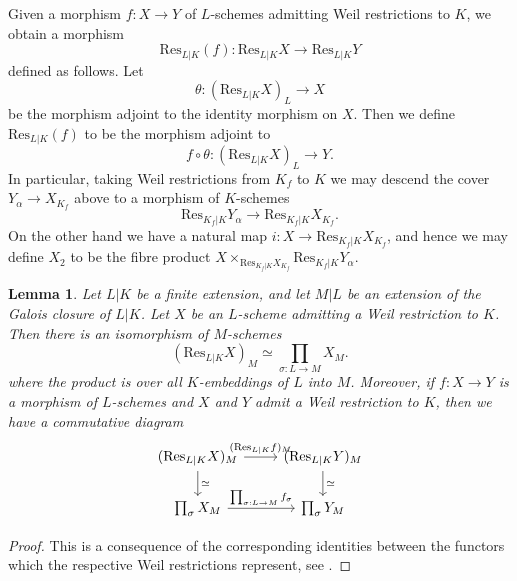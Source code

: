 \documentclass[11pt]{amsart}
\theoremstyle{plain}
\newtheorem{lemma}{Lemma}
\theoremstyle{definition}
\newcommand{\Res}{\mathrm{Res}}
\begin{document}
Given a morphism $f:X\to Y$ of $L$-schemes admitting Weil restrictions to $K$, we obtain a morphism
\[
\Res _{L|K}(f):\Res _{L|K}X\to \Res _{L|K}Y
\]
defined as follows. Let 
\[
\theta :(\Res _{L|K}X )_L \to X
\]
be the morphism adjoint to the identity morphism on $X$. Then we define $\Res _{L|K}(f)$ to be the morphism adjoint to 
\[
f\circ \theta : (\Res _{L|K}X)_L \to Y.
\]
In particular, taking Weil restrictions from $K_f$ to $K$ we may descend the cover $Y_{\alpha }\to X_{K_f }$ above to a morphism of $K$-schemes
\[
\Res _{K_f |K}Y_{\alpha }\to \Res _{K_f |K}X_{K_f }.
\]
On the other hand we have a natural map $i:X\to \Res _{K_f |K}X_{K_f }$, and hence we may define $X_2 $ to be the fibre product $X\times _{\Res _{K_f |K}X_{K_f }}\Res _{K_f |K}Y_{\alpha }.$

\begin{lemma}\label{lemma:WeilRes}
Let $L|K$ be a finite extension, and let $M|L$ be an extension of the Galois closure of $L|K$. Let $X$ be an $L$-scheme admitting a Weil restriction to $K$. Then there is an isomorphism of $M$-schemes
\begin{equation}\label{eqn:WeilresGalois}
(\Res _{L|K}X)_M \simeq \prod _{\sigma :L\to M}X_M .
\end{equation}
where the product is over all $K$-embeddings of $L$ into $M$. Moreover, if $f:X\to Y$ is a morphism of $L$-schemes and $X$ and $Y$ admit a Weil restriction to $K$, then we have a commutative diagram
\[
\begin{tikzcd}
(\Res _{L|K}X)_M \arrow[d, "\simeq"] \arrow[r, "(\Res _{L|K}f)_M"] & (\Res _{L|K}Y)_M \arrow[d, "\simeq "] \\
\prod _{\sigma }X_M \arrow[r, "\prod _{\sigma :L\to M}f_{\sigma }"]                                                     & \prod _{\sigma }Y_M                                                
\end{tikzcd}
\]
\end{lemma}
\begin{proof}
This is a consequence of the corresponding identities between the functors which the respective Weil restrictions represent, see \cite[7.6, p.192]{BLR}.
\end{proof}
\end{document}
